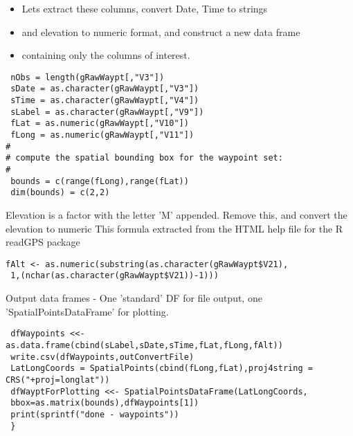 \documentclass{beamer}
\begin{document}
\begin{frame}
\begin{itemize}
\item Lets extract these columns, convert Date, Time to strings 
\item and elevation to numeric format, and construct a new data frame
\item containing only the columns of interest.
\end{itemize}
\end{frame}
\begin{frame}[fragile]
\begin{framed}
\begin{verbatim}
 nObs = length(gRawWaypt[,"V3"])
 sDate = as.character(gRawWaypt[,"V3"])
 sTime = as.character(gRawWaypt[,"V4"])
 sLabel = as.character(gRawWaypt[,"V9"]) 
 fLat = as.numeric(gRawWaypt[,"V10"])
 fLong = as.numeric(gRawWaypt[,"V11"])
#
# compute the spatial bounding box for the waypoint set:
#
 bounds = c(range(fLong),range(fLat))
 dim(bounds) = c(2,2)
\end{verbatim}
\end{framed}
\end{frame}
\begin{frame}[fragile] 
Elevation is a factor with the letter 'M' appended.
Remove this, and convert the elevation to numeric
This formula extracted from the HTML help file for the R readGPS package

\begin{verbatim}
fAlt <- as.numeric(substring(as.character(gRawWaypt$V21),
 1,(nchar(as.character(gRawWaypt$V21))-1)))
\end{verbatim}
Output data frames - One 'standard' DF for file output,
one 'SpatialPointsDataFrame' for plotting.
\end{frame}

\begin{frame}[fragile]
\begin{verbatim}
 dfWaypoints <<- as.data.frame(cbind(sLabel,sDate,sTime,fLat,fLong,fAlt)) 
 write.csv(dfWaypoints,outConvertFile)
 LatLongCoords = SpatialPoints(cbind(fLong,fLat),proj4string = CRS("+proj=longlat"))
 dfWayptForPlotting <<- SpatialPointsDataFrame(LatLongCoords,
 bbox=as.matrix(bounds),dfWaypoints[1])
 print(sprintf("done - waypoints"))
 }
\end{verbatim}
\end{frame}
\end{document}
